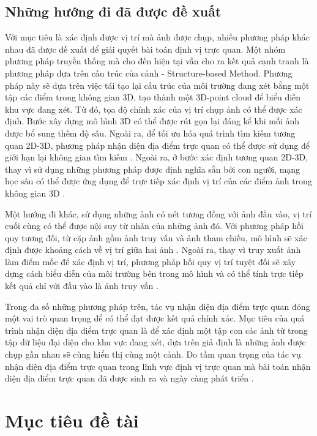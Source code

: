 \subsection{Những hướng đi đã được đề xuất}

Với mục tiêu là xác định được vị trí mà ảnh được chụp, nhiều phương pháp khác nhau đã được đề xuất để giải quyết bài toán định vị trực quan. Một nhóm phương pháp truyền thống mà cho đến hiện tại vẫn cho ra kết quả cạnh tranh là phương pháp dựa trên cấu trúc của cảnh - Structure-based Method. Phương pháp này sẽ dựa trên việc tái tạo lại cấu trúc của môi trường đang xét bằng một tập các điểm trong không gian 3D, tạo thành một 3D-point cloud để biểu diễn khu vực đang xét. Từ đó, tọa độ chính xác của vị trí chụp ảnh có thể được xác định. Bước xây dựng mô hình 3D có thể được rút gọn lại đáng kể khi mỗi ảnh được bổ sung thêm độ sâu. Ngoài ra, để tối ưu hóa quá trình tìm kiếm tương quan 2D-3D, phương pháp nhận diện địa điểm trực quan có thể được sử dụng để giới hạn lại không gian tìm kiếm \cite{sarlin2019coarse}. Ngoài ra, ở bước xác định tương quan 2D-3D, thay vì sử dụng những phương pháp được định nghĩa sẵn bởi con người, mạng học sâu có thể được ứng dụng để trực tiếp xác định vị trí của các điểm ảnh trong không gian 3D \cite{brachmann2021visual}.

Một hướng đi khác, sử dụng những ảnh có nét tương đồng với ảnh đầu vào, vị trí cuối cùng có thể được nội suy từ nhãn của những ảnh đó. Với phương pháp hồi quy tương đối, từ cặp ảnh gồm ảnh truy vấn và ảnh tham chiếu, mô hình sẽ xác định được khoảng cách về vị trí giữa hai ảnh \cite{zhou2020learn}. Ngoài ra, thay vì truy xuất ảnh làm điểm mốc để xác định vị trí, phương pháp hồi quy vị trí tuyệt đối sẽ xây dựng cách biểu diễn của môi trường bên trong mô hình và có thể tính trực tiếp kết quả chỉ với đầu vào là ảnh truy vấn \cite{kendall2016posenet}.

Trong đa số những phương pháp trên, tác vụ nhận diện địa điểm trực quan đóng một vai trò quan trọng để có thể đạt được kết quả chính xác. Mục tiêu của quá trình nhận diện địa điểm trực quan là để xác định một tập con các ảnh từ trong tập dữ liệu đại diện cho khu vực đang xét, dựa trên giả định là những ảnh được chụp gần nhau sẽ cùng hiển thị cùng một cảnh. Do tầm quan trọng của tác vụ nhận diện địa điểm trực quan trong lĩnh vực định vị trực quan mà bài toán nhận diện địa điểm trực quan đã được sinh ra và ngày càng phát triển \cite{berton2022rethinking}\cite{keetha2023anyloc}\cite{alibey2023mixvpr}.

\section{Mục tiêu đề tài}

